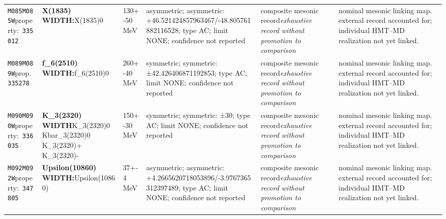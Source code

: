 \begin{landscape}
\begin{longtable}{L{1.85cm}L{4.45cm}L{2.35cm}L{4.05cm}L{3.35cm}L{7.15cm}}
\texttt{M085}\newline \texttt{M085W}\newline property:\ \texttt{335012} & \textbf{X(1835) WIDTH:}\newline X(1835)0 & 130+-50\,MeV & asymmetric; asymmetric: +46.521424857963467/-48.805761882116528; type AC; limit NONE; confidence not reported & composite mesonic record\newline \emph{exhaustive record without promotion to comparison} & nominal mesonic linking map. external record accounted for; individual HMT--MD realization not yet linked. \\
\texttt{M089}\newline \texttt{M089W}\newline prop.\ \texttt{335278} & \textbf{f\_\allowbreak{}6(2510) WIDTH:}\newline f\_\allowbreak{}6(2510)0 & 260+-40\,MeV & symmetric; symmetric: ±42.426406871192853; type AC; limit NONE; confidence not reported & composite mesonic record\newline \emph{exhaustive record without promotion to comparison} & nominal mesonic linking map. external record accounted for; individual HMT--MD realization not yet linked. \\
\texttt{M090}\newline \texttt{M090W}\newline property:\ \texttt{336035} & \textbf{K\_\allowbreak{}3(2320) WIDTH}\newline K\_\allowbreak{}3(2320)0 \textbar{}\allowbreak{} Kbar\_\allowbreak{}3(2320)0 \textbar{}\allowbreak{} K\_\allowbreak{}3(2320)+ \textbar{}\allowbreak{} K\_\allowbreak{}3(2320)- & 150+-30\,MeV & symmetric; symmetric: ±30; type AC; limit NONE; confidence not reported & composite mesonic record\newline \emph{exhaustive record without promotion to comparison} & nominal mesonic linking map. external record accounted for; individual HMT--MD realization not yet linked. \\
\texttt{M092}\newline \texttt{M092W}\newline property:\ \texttt{347805} & \textbf{Upsilon(10860) WIDTH:}\newline Upsilon(10860) & 37+-4\,MeV & asymmetric; asymmetric: +4.2665620718053896/-3.9767365312397489; type AC; limit NONE; confidence not reported & composite mesonic record\newline \emph{exhaustive record without promotion to comparison} & nominal mesonic linking map. external record accounted for; individual HMT--MD realization not yet linked. \\

\end{longtable}
\end{landscape}

